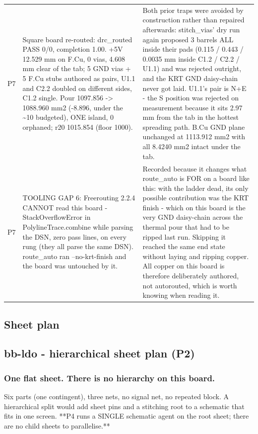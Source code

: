 \documentclass[11pt,a4paper]{article}
\begin{document}
{\begin{longtable}{lp{5.2cm}p{7.2cm}}
P7 & Square board re-routed: drc\_routed PASS 0/0, completion 1.00. +5V 12.529 mm on F.Cu, 0 vias, 4.608 mm clear of the tab; 5 GND vias + 5 F.Cu stubs authored as pairs, U1.1 and C2.2 doubled on different sides, C1.2 single. Pour 1097.856 -\textgreater{} 1088.960 mm2 (-8.896, under the \textasciitilde{}10 budgeted), ONE island, 0 orphaned; r20 1015.854 (floor 1000). & Both prior traps were avoided by construction rather than repaired afterwards: stitch\_vias' dry run again proposed 3 barrels ALL inside their pads (0.115 / 0.443 / 0.0035 mm inside C1.2 / C2.2 / U1.1) and was rejected outright, and the KRT GND daisy-chain never got laid. U1.1's pair is N+E - the S position was rejected on measurement because it sits 2.97 mm from the tab in the hottest spreading path. B.Cu GND plane unchanged at 1113.912 mm2 with all 8.4240 mm2 intact under the tab. \\
P7 & TOOLING GAP 6: Freerouting 2.2.4 CANNOT read this board - StackOverflowError in PolylineTrace.combine while parsing the DSN, zero pass lines, on every rung (they all parse the same DSN). route\_auto ran --no-krt-finish and the board was untouched by it. & Recorded because it changes what route\_auto is FOR on a board like this: with the ladder dead, its only possible contribution was the KRT finish - which on this board is the very GND daisy-chain across the thermal pour that had to be ripped last run. Skipping it reached the same end state without laying and ripping copper. All copper on this board is therefore deliberately authored, not autorouted, which is worth knowing when reading it. \\
\bottomrule
\end{longtable}
}
\subsection*{Sheet plan}
\subsection*{bb-ldo - hierarchical sheet plan (P2)}
\subsubsection*{One flat sheet. There is no hierarchy on this board.}
Six parts (one contingent), three nets, no signal net, no repeated block. A hierarchical split would add sheet pins and a stitching root to a schematic that fits in one screen. {*}{*}P4 runs a SINGLE schematic agent on the root sheet; there are no child sheets to parallelise.{*}{*}
\end{document}
